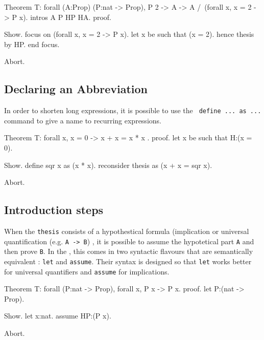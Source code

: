 \begin{coq_eval}
Theorem T: forall (A:Prop) (P:nat -> Prop), P 2 -> A -> A /\ (forall x, x = 2 -> P x).
intros A P HP HA.
proof.
\end{coq_eval} 
\begin{coq_example}
Show.
focus on (forall x, x = 2 -> P x).
let x be such that (x = 2).
hence thesis by HP.
end focus.
\end{coq_example}
\begin{coq_eval}
Abort.
\end{coq_eval}

\subsection{Declaring an Abbreviation}

In order to shorten long expressions, it is possible to use the {\tt
  define ... as ...} command to give a name to recurring expressions.

\begin{coq_eval}
Theorem T: forall x, x = 0 -> x + x = x * x .
proof.
let x be such that H:(x = 0).
\end{coq_eval} 
\begin{coq_example}
Show.
define sqr x as (x * x).
reconsider thesis as (x + x = sqr x).
\end{coq_example}
\begin{coq_eval}
Abort.
\end{coq_eval}

\subsection{Introduction steps}

When the {\tt thesis} consists of a hypothestical formula (implication
or universal quantification (e.g. \verb+A -> B+) , it is possible to
assume the hypotetical part {\tt A} and then prove {\tt B}. In the
\DPL{}, this comes in two syntactic flavours that are semantically
equivalent : {\tt let} and {\tt assume}. Their syntax is designed so that {\tt let} works better for universal quantifiers and {\tt assume} for implications.

\begin{coq_eval}
Theorem T: forall (P:nat -> Prop), forall x, P x -> P x.
proof.
let P:(nat -> Prop).
\end{coq_eval} 
\begin{coq_example}
Show.
let x:nat.
assume HP:(P x).
\end{coq_example}
\begin{coq_eval}
Abort.
\end{coq_eval}

